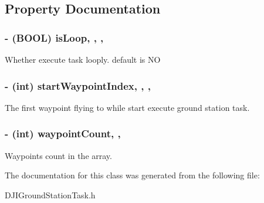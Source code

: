 \subsection{Property Documentation}
\hypertarget{interface_d_j_i_ground_station_task_a70be24676a424200a4a1a6bcf599da52}{
\subsubsection[{is\+Loop}]{\setlength{\rightskip}{0pt plus 5cm}-\/ (B\+O\+O\+L) is\+Loop\hspace{0.3cm}{\ttfamily [read]}, {\ttfamily [write]}, {\ttfamily [nonatomic]}, {\ttfamily [assign]}}}\label{interface_d_j_i_ground_station_task_a70be24676a424200a4a1a6bcf599da52}
Whether execute task looply. default is N\+O \hypertarget{interface_d_j_i_ground_station_task_a57ebabc8cd8f1442aeded5c172e8140d}{
\subsubsection[{start\+Waypoint\+Index}]{\setlength{\rightskip}{0pt plus 5cm}-\/ (int) start\+Waypoint\+Index\hspace{0.3cm}{\ttfamily [read]}, {\ttfamily [write]}, {\ttfamily [nonatomic]}, {\ttfamily [assign]}}}\label{interface_d_j_i_ground_station_task_a57ebabc8cd8f1442aeded5c172e8140d}
The first waypoint flying to while start execute ground station task. \hypertarget{interface_d_j_i_ground_station_task_a65a83abb7d82b8789e6be54ba4307aff}{
\subsubsection[{waypoint\+Count}]{\setlength{\rightskip}{0pt plus 5cm}-\/ (int) waypoint\+Count\hspace{0.3cm}{\ttfamily [read]}, {\ttfamily [nonatomic]}, {\ttfamily [assign]}}}\label{interface_d_j_i_ground_station_task_a65a83abb7d82b8789e6be54ba4307aff}
Waypoints count in the array. 

The documentation for this class was generated from the following file\+:\begin{DoxyCompactItemize}
\item 
D\+J\+I\+Ground\+Station\+Task.\+h\end{DoxyCompactItemize}
